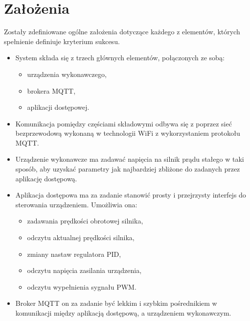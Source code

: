   
    \newpage
    \section{Założenia}


    
    Zostały zdefiniowane ogólne założenia dotyczące każdego z elementów, których spełnienie definiuje kryterium sukcesu.
    
    \begin{itemize}
        \item    System składa się z trzech głównych elementów, połączonych ze sobą:
            \begin{itemize}
                \item urządzenia wykonawczego,
                \item brokera MQTT,
                \item aplikacji dostępowej.
            \end{itemize}
            
        \item     Komunikacja pomiędzy częściami składowymi odbywa się z poprzez sieć bezprzewodową wykonaną w technologii WiFi z wykorzystaniem protokołu MQTT.
        \item     Urządzenie wykonawcze ma zadawać napięcia na silnik prądu stałego w taki sposób, aby uzyskać parametry jak najbardziej zbliżone do zadanych przez aplikację dostępową.   
        \item    Aplikacja dostępowa ma za zadanie stanowić prosty i przejrzysty interfejs do sterowania urządzeniem. Umożliwia ona:
    
            \begin{itemize}
                \item zadawania prędkości obrotowej silnika,
                \item odczytu aktualnej prędkości silnika,
                \item zmiany nastaw regulatora PID,
                \item odczytu napięcia zasilania urządzenia,
                \item odczytu wypełnienia sygnału PWM.
            \end{itemize}
            
        \item    Broker MQTT on za zadanie być lekkim i szybkim pośrednikiem w komunikacji między aplikacją dostępową, a urządzeniem wykonawczym.
    \end{itemize}
 

